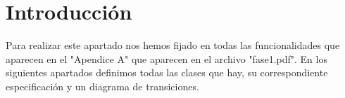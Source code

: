 \section{Introducción}
Para realizar este apartado nos hemos fijado en todas las funcionalidades que aparecen en el "Apendice A"
que aparecen en el archivo "fase1.pdf". En los siguientes apartados definimos todas las clases que hay, su correspondiente especificación 
y un diagrama de transiciones.